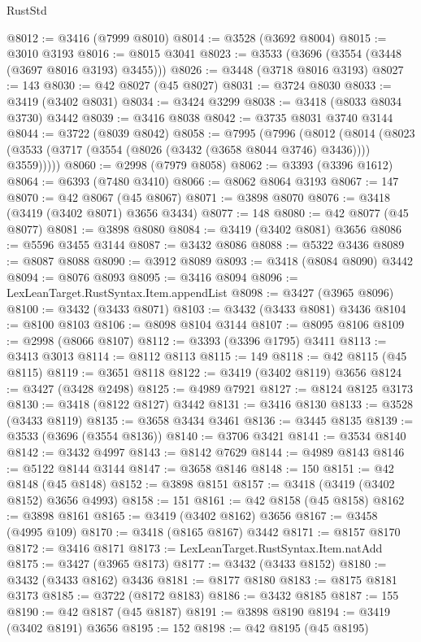 \begin{lexlean}{RustStd}
\begin{coremodule}
@8012 := @3416 (@7999 @8010)
@8014 := @3528 (@3692 @8004)
@8015 := @3010 @3193
@8016 := @8015 @3041
@8023 := @3533 (@3696 (@3554 (@3448 (@3697 @8016 @3193) @3455)))
@8026 := @3448 (@3718 @8016 @3193)
@8027 := 143
@8030 := @42 @8027 (@45 @8027)
@8031 := @3724 @8030
@8033 := @3419 (@3402 @8031)
@8034 := @3424 @3299
@8038 := @3418 (@8033 @8034 @3730) @3442
@8039 := @3416 @8038
@8042 := @3735 @8031 @3740 @3144
@8044 := @3722 (@8039 @8042)
@8058 := @7995
    (@7996
      (@8012
        (@8014 (@8023 (@3533 (@3717 (@3554 (@8026 (@3432 (@3658 @8044 @3746) @3436)))) @3559)))))
@8060 := @2998 (@7979 @8058)
@8062 := @3393 (@3396 @1612)
@8064 := @6393 (@7480 @3410)
@8066 := @8062 @8064 @3193
@8067 := 147
@8070 := @42 @8067 (@45 @8067)
@8071 := @3898 @8070
@8076 := @3418 (@3419 (@3402 @8071) @3656 @3434)
@8077 := 148
@8080 := @42 @8077 (@45 @8077)
@8081 := @3898 @8080
@8084 := @3419 (@3402 @8081) @3656
@8086 := @5596 @3455 @3144
@8087 := @3432 @8086
@8088 := @5322 @3436
@8089 := @8087 @8088
@8090 := @3912 @8089
@8093 := @3418 (@8084 @8090) @3442
@8094 := @8076 @8093
@8095 := @3416 @8094
@8096 := LexLeanTarget.RustSyntax.Item.appendList
@8098 := @3427 (@3965 @8096)
@8100 := @3432 (@3433 @8071)
@8103 := @3432 (@3433 @8081) @3436
@8104 := @8100 @8103
@8106 := @8098 @8104 @3144
@8107 := @8095 @8106
@8109 := @2998 (@8066 @8107)
@8112 := @3393 (@3396 @1795) @3411
@8113 := @3413 @3013
@8114 := @8112 @8113
@8115 := 149
@8118 := @42 @8115 (@45 @8115)
@8119 := @3651 @8118
@8122 := @3419 (@3402 @8119) @3656
@8124 := @3427 (@3428 @2498)
@8125 := @4989 @7921
@8127 := @8124 @8125 @3173
@8130 := @3418 (@8122 @8127) @3442
@8131 := @3416 @8130
@8133 := @3528 (@3433 @8119)
@8135 := @3658 @3434 @3461
@8136 := @3445 @8135
@8139 := @3533 (@3696 (@3554 @8136))
@8140 := @3706 @3421
@8141 := @3534 @8140
@8142 := @3432 @4997
@8143 := @8142 @7629
@8144 := @4989 @8143
@8146 := @5122 @8144 @3144
@8147 := @3658 @8146
@8148 := 150
@8151 := @42 @8148 (@45 @8148)
@8152 := @3898 @8151
@8157 := @3418 (@3419 (@3402 @8152) @3656 @4993)
@8158 := 151
@8161 := @42 @8158 (@45 @8158)
@8162 := @3898 @8161
@8165 := @3419 (@3402 @8162) @3656
@8167 := @3458 (@4995 @109)
@8170 := @3418 (@8165 @8167) @3442
@8171 := @8157 @8170
@8172 := @3416 @8171
@8173 := LexLeanTarget.RustSyntax.Item.natAdd
@8175 := @3427 (@3965 @8173)
@8177 := @3432 (@3433 @8152)
@8180 := @3432 (@3433 @8162) @3436
@8181 := @8177 @8180
@8183 := @8175 @8181 @3173
@8185 := @3722 (@8172 @8183)
@8186 := @3432 @8185
@8187 := 155
@8190 := @42 @8187 (@45 @8187)
@8191 := @3898 @8190
@8194 := @3419 (@3402 @8191) @3656
@8195 := 152
@8198 := @42 @8195 (@45 @8195)

\end{coremodule}
\end{lexlean}

